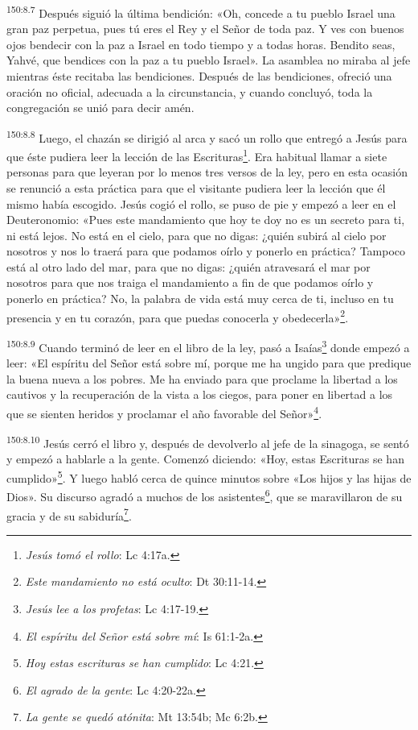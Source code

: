 \par
\textsuperscript{150:8.7} Después siguió la última bendición: «Oh, concede a tu pueblo Israel una gran paz perpetua, pues tú eres el Rey y el Señor de toda paz. Y ves con buenos ojos bendecir con la paz a Israel en todo tiempo y a todas horas. Bendito seas, Yahvé, que bendices con la paz a tu pueblo Israel». La asamblea no miraba al jefe mientras éste recitaba las bendiciones. Después de las bendiciones, ofreció una oración no oficial, adecuada a la circunstancia, y cuando concluyó, toda la congregación se unió para decir amén.

\par
\textsuperscript{150:8.8} Luego, el chazán se dirigió al arca y sacó un rollo que entregó a Jesús para que éste pudiera leer la lección de las Escrituras\footnote{\textit{Jesús tomó el rollo}: Lc 4:17a.}. Era habitual llamar a siete personas para que leyeran por lo menos tres versos de la ley, pero en esta ocasión se renunció a esta práctica para que el visitante pudiera leer la lección que él mismo había escogido. Jesús cogió el rollo, se puso de pie y empezó a leer en el Deuteronomio: «Pues este mandamiento que hoy te doy no es un secreto para ti, ni está lejos. No está en el cielo, para que no digas: ¿quién subirá al cielo por nosotros y nos lo traerá para que podamos oírlo y ponerlo en práctica? Tampoco está al otro lado del mar, para que no digas: ¿quién atravesará el mar por nosotros para que nos traiga el mandamiento a fin de que podamos oírlo y ponerlo en práctica? No, la palabra de vida está muy cerca de ti, incluso en tu presencia y en tu corazón, para que puedas conocerla y obedecerla»\footnote{\textit{Este mandamiento no está oculto}: Dt 30:11-14.}.

\par
\textsuperscript{150:8.9} Cuando terminó de leer en el libro de la ley, pasó a Isaías\footnote{\textit{Jesús lee a los profetas}: Lc 4:17-19.} donde empezó a leer: «El espíritu del Señor está sobre mí, porque me ha ungido para que predique la buena nueva a los pobres. Me ha enviado para que proclame la libertad a los cautivos y la recuperación de la vista a los ciegos, para poner en libertad a los que se sienten heridos y proclamar el año favorable del Señor»\footnote{\textit{El espíritu del Señor está sobre mí}: Is 61:1-2a.}.

\par
\textsuperscript{150:8.10} Jesús cerró el libro y, después de devolverlo al jefe de la sinagoga, se sentó y empezó a hablarle a la gente. Comenzó diciendo: «Hoy, estas Escrituras se han cumplido»\footnote{\textit{Hoy estas escrituras se han cumplido}: Lc 4:21.}. Y luego habló cerca de quince minutos sobre «Los hijos y las hijas de Dios». Su discurso agradó a muchos de los asistentes\footnote{\textit{El agrado de la gente}: Lc 4:20-22a.}, que se maravillaron de su gracia y de su sabiduría\footnote{\textit{La gente se quedó atónita}: Mt 13:54b; Mc 6:2b.}.

